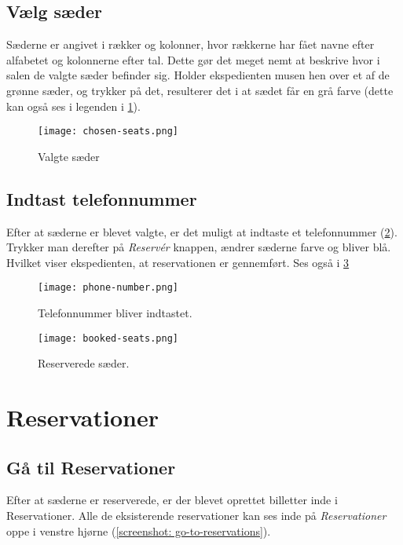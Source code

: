 \subsection{Vælg sæder}

Sæderne er angivet i rækker og kolonner, hvor rækkerne har fået navne efter alfabetet og kolonnerne efter tal. Dette gør det meget nemt at beskrive hvor i salen de valgte sæder befinder sig. Holder ekspedienten musen hen over et af de grønne sæder, og trykker på det, resulterer det i at sædet får en grå farve (dette kan også ses i legenden i \ref{screenshot: chosen-seats}).

\begin{figure} [h]
  \centering
  \texttt{[image: chosen-seats.png]}
  \caption{Valgte sæder}
  \label{screenshot: chosen-seats}
\end{figure}

\subsection{Indtast telefonnummer}

Efter at sæderne er blevet valgte, er det muligt at indtaste et telefonnummer (\ref{screenshot: phone-number}). Trykker man derefter på \textit{Reservér} knappen, ændrer sæderne farve og bliver blå. Hvilket viser ekspedienten, at reservationen er gennemført. Ses også i \ref{screenshot: booked-seats}

\begin{figure} [h]
  \centering
  \texttt{[image: phone-number.png]}
  \caption{Telefonnummer bliver indtastet.}
  \label{screenshot: phone-number}
\end{figure}

\begin{figure} [h]
  \centering
  \texttt{[image: booked-seats.png]}
  \caption{Reserverede sæder.}
  \label{screenshot: booked-seats}
\end{figure}

\section{Reservationer}

\subsection{Gå til Reservationer}
Efter at sæderne er reserverede, er der blevet oprettet billetter inde i Reservationer. Alle de eksisterende reservationer kan ses inde på \textit{Reservationer} oppe i venstre hjørne (\ref{screenshot: go-to-reservations}).

